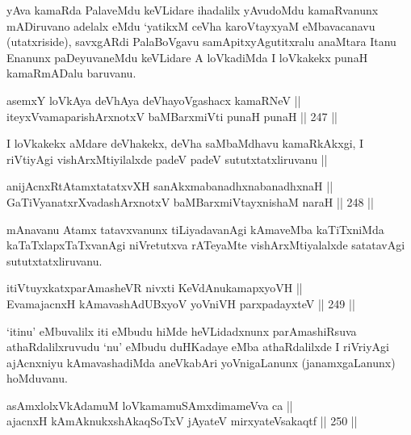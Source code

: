 \begin{artha}
yAva kamaRda PalaveMdu keVLidare ihadalilx yAvudoMdu kamaRvanunx
mADiruvano adelalx eMdu `yatikxM ceVha karoVtayxyaM eMbavacanavu
(utatxriside), savxgARdi PalaBoVgavu samApitxyAgutitxralu anaMtara
Itanu Enanunx paDeyuvaneMdu keVLidare A loVkadiMda I loVkakekx punaH
kamaRmADalu baruvanu.
\end{artha}


\begin{shl}
asemxY loVkAya deVhAya deVhayoVgashacx kamaRNeV || \\
iteyxVvamaparishArxnotxV baMBarxmiVti punaH punaH ||  247 ||  
\end{shl}

\begin{artha}
I loVkakekx aMdare deVhakekx, deVha saMbaMdhavu kamaRkAkxgi, I
riVtiyAgi vishArxMtiyilalxde padeV padeV sututxtatxliruvanu || 
\end{artha}


\begin{shl}
anijAcnxRtAtamxtatatxvXH sanAkxmabanadhxnabanadhxnaH || \\
GaTiVyanatxrXvadashArxnotxV baMBarxmiVtayxnishaM naraH ||  248 ||  
\end{shl}

\begin{artha}
mAnavanu Atamx tatavxvanunx tiLiyadavanAgi kAmaveMba kaTiTxniMda
kaTaTxlapxTaTxvanAgi niVretutxva rATeyaMte vishArxMtiyalalxde satatavAgi
sututxtatxliruvanu.
\end{artha}

\begin{shl}
itiVtuyxkatxparAmasheVR nivxti KeVdAnukamapxyoVH || \\
EvamajacnxH kAmavashAdUBxyoV yoVniVH parxpadayxteV ||  249 ||  
\end{shl}

\begin{artha}
`itinu' eMbuvalilx iti eMbudu hiMde heVLidadxnunx parAmashiRsuva
athaRdalilxruvudu `nu' eMbudu duHKadaye eMba athaRdalilxde I riVriyAgi
ajAcnxniyu kAmavashadiMda aneVkabAri yoVnigaLanunx (janamxgaLanunx)
hoMduvanu.
\end{artha}


\begin{shl}
asAmxlolxVkAdamuM loVkamamuSAmxdimameVva ca || \\
ajacnxH kAmAknukxshAkaqSoTxV jAyateV mirxyateV\s sakaqtf ||  250 ||  
\end{shl}

